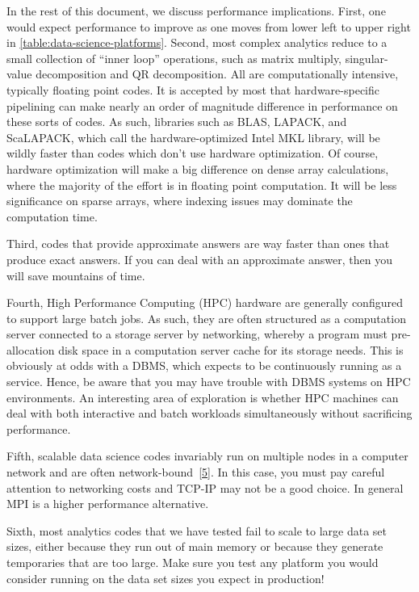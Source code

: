 \documentclass[b5paper,11pt,twoside,openright]{book}
\begin{document}
In the rest of this document, we discuss performance implications.
First, one would expect performance to improve as one moves from lower
left to upper right in \autoref{table:data-science-platforms}. Second, most complex analytics reduce to
a small collection of ``inner loop'' operations, such as matrix
multiply, singular-value decomposition and QR decomposition. All are
computationally intensive, typically floating point codes. It is
accepted by most that hardware-specific pipelining can make nearly an
order of magnitude difference in performance on these sorts of codes. As
such, libraries such as BLAS, LAPACK, and ScaLAPACK, which call the
hardware-optimized Intel MKL library, will be wildly faster than codes
which don't use hardware optimization. Of course, hardware optimization
will make a big difference on dense array calculations, where the
majority of the effort is in floating point computation. It will be less
significance on sparse arrays, where indexing issues may dominate the
computation time.

Third, codes that provide approximate answers are way faster than ones
that produce exact answers. If you can deal with an approximate answer,
then you will save mountains of time.

Fourth, High Performance Computing (HPC) hardware are generally
configured to support large batch jobs. As such, they are often
structured as a computation server connected to a storage server by
networking, whereby a program must pre-allocation disk space in a
computation server cache for its storage needs. This is obviously at
odds with a DBMS, which expects to be continuously running as a service.
Hence, be aware that you may have trouble with DBMS systems on HPC
environments. An interesting area of exploration is whether HPC machines
can deal with both interactive and batch workloads simultaneously
without sacrificing performance.

Fifth, scalable data science codes invariably run on multiple nodes in a
computer network and are often
network-bound~{{[}\protect\hyperlink{ref-duggan-array}{5}{]}}. In this
case, you must pay careful attention to networking costs and TCP-IP may
not be a good choice. In general MPI is a higher performance
alternative.

Sixth, most analytics codes that we have tested fail to scale to large
data set sizes, either because they run out of main memory or because
they generate temporaries that are too large. Make sure you test any
platform you would consider running on the data set sizes you expect in
production!
\end{document}
